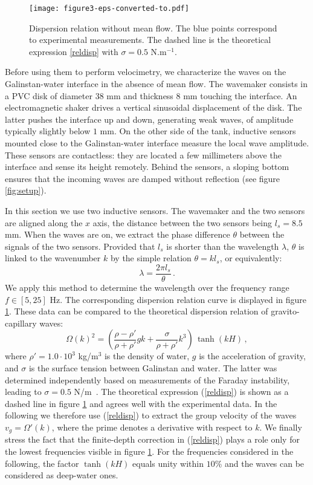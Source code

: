 \documentclass[doublecol]{epl2} %
\begin{document}
\begin{figure}
\texttt{[image: figure3-eps-converted-to.pdf]}
\caption{Dispersion relation without mean flow. The blue points correspond to experimental measurements. The dashed line is the theoretical expression \eqref{reldisp} with $\sigma = 0.5$ N.m$^{-1}$. \label{fig:disprel}}
\end{figure}

Before using them to perform velocimetry, we characterize the waves on the Galinstan-water interface in the absence of mean flow. The wavemaker consists in a PVC disk of diameter 38 mm and thickness 8 mm touching the interface. An electromagnetic shaker drives a vertical sinusoidal displacement of the disk. The latter pushes the interface up and down, generating weak waves, of amplitude typically slightly below $1$ mm.  On the other side of the tank, inductive sensors mounted close to the Galinstan-water interface measure the local wave amplitude. These sensors are contactless: they are located a few millimeters above the interface and sense its height remotely. Behind the sensors, a sloping bottom ensures that the incoming waves are damped without reflection (see figure \ref{fig:setup}).

In this section we use two inductive sensors. The wavemaker and the two sensors are aligned along the $x$ axis, the distance between the two sensors being  $l_s=8.5$ mm. When the waves are on, we extract the phase difference $\theta$ between the signals of the two sensors. Provided that $l_s$ is shorter than the wavelength $\lambda$, $\theta$ is linked to the wavenumber $k$ by the simple relation $\theta=k l_s$, or equivalently:
\begin{equation}
\lambda=\frac{2\pi l_s}{\theta} \, .
\label{lambda}
\end{equation}
We apply this method to determine the wavelength over the frequency range $f \in [5, 25]$ Hz. The corresponding dispersion relation curve is displayed in figure \ref{fig:disprel}. These data can be compared to the theoretical dispersion relation of gravito-capillary waves:
\begin{equation}
\Omega(k)^2=\left( \frac{\rho-\rho'}{\rho+\rho'}gk+\frac{\sigma}{\rho+\rho'}k^3 \right) \, \tanh(kH) \, , \label{reldisp}
\end{equation}
where $\rho' = 1.0  \cdot 10^3$ kg/m$^3$ is the density of water, $g$ is the acceleration of gravity, and $\sigma$ is the surface tension between Galinstan and water. The latter was determined independently based on measurements of the Faraday instability, leading to $\sigma=0.5$ N/m~\cite{Gutierrez2016}. The theoretical expression (\ref{reldisp}) is shown as a dashed line in figure \ref{fig:disprel} and agrees well with the experimental data. In the following we therefore use (\ref{reldisp}) to extract the group velocity of the waves $v_g=\Omega'(k)$, where the prime denotes a derivative with respect to $k$. We finally stress the fact that the finite-depth correction in (\ref{reldisp}) plays a role only for the lowest frequencies visible in figure \ref{fig:disprel}. For the frequencies considered in the following, the factor $\tanh(kH)$ equals unity within $10$\% and the waves can be considered as deep-water ones.
\end{document}

